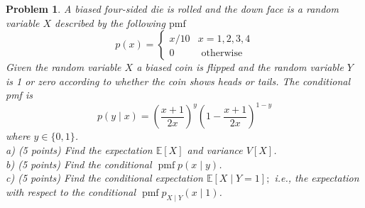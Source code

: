 \documentclass[11pt]{amsart}
\newtheorem{problem}{Problem}
\theoremstyle{definition}
\begin{document}
\begin{problem}
A biased four-sided die is rolled and the down face is a random variable $X$ described by the following $\mathrm{pmf}$
$$
p(x)=\left\{\begin{array}{ll}
x / 10 & x=1,2,3,4 \\
0 & \text { otherwise }
\end{array}\right.
$$
Given the random variable $X$ a biased coin is flipped and the random variable $Y$ is 1 or zero according to whether the coin shows heads or tails. The conditional pmf is
$$
p(y \mid x)=\left(\frac{x+1}{2 x}\right)^{y}\left(1-\frac{x+1}{2 x}\right)^{1-y}
$$
where $y \in\{0,1\}$.\\
a) (5 points) Find the expectation $\mathbb{E}[X]$ and variance $V[X]$.\\
b) (5 points) Find the conditional $\operatorname{pmf} p(x \mid y)$.\\
c) (5 points) Find the conditional expectation $\mathbb{E}[X \mid Y=1] ;$ i.e., the expectation with respect to the conditional $\operatorname{pmf} p_{X \mid Y}(x \mid 1)$.
\end{problem}
\end{document}
